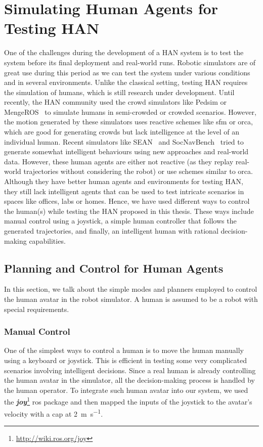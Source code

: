\chapter{Simulating Human Agents for Testing HAN}
One of the challenges during the development of a HAN system is to test the system before its final deployment and real-world runs. Robotic simulators are of great use during this period as we can test the system under various conditions and in several environments. Unlike the classical setting, testing HAN requires the simulation of humans, which is still research under development. Until recently, the HAN community used the crowd simulators like Pedsim or MengeROS~\cite{aroor2017mengeros} to simulate humans in semi-crowded or crowded scenarios. However, the motion generated by these simulators uses reactive schemes like \acrshort{sfm} or \acrshort{orca}, which are good for generating crowds but lack intelligence at the level of an individual human. Recent simulators like SEAN~\cite{tsoi2020sean, tsoi2022sean} and SocNavBench~\cite{biswas2022socnavbench} tried to generate somewhat intelligent behaviours using new approaches and real-world data. However, these human agents are either not reactive (as they replay real-world trajectories without considering the robot) or use schemes similar to \acrshort{orca}. Although they have better human agents and environments for testing HAN, they still lack intelligent agents that can be used to test intricate scenarios in spaces like offices, labs or homes. Hence, we have used different ways to control the human(s) while testing the HAN proposed in this thesis. These ways include manual control using a joystick, a simple human controller that follows the generated trajectories, and finally, an intelligent human with rational decision-making capabilities.      

\section{Planning and Control for Human Agents}
In this section, we talk about the simple modes and planners employed to control the human avatar in the robot simulator. A human is assumed to be a robot with special requirements.

\subsection{Manual Control}
One of the simplest ways to control a human is to move the human manually using a keyboard or joystick. This is efficient in testing some very complicated scenarios involving intelligent decisions. Since a real human is already controlling the human avatar in the simulator, all the decision-making process is handled by the human operator. To integrate such human avatar into our system, we used the \textbf{\textit{joy}}\footnote{\url{http://wiki.ros.org/joy}} \acrshort{ros} package and then mapped the inputs of the joystick to the avatar's velocity with a cap at \SI[per-mode=symbol]{2}{\metre\per\second}.

